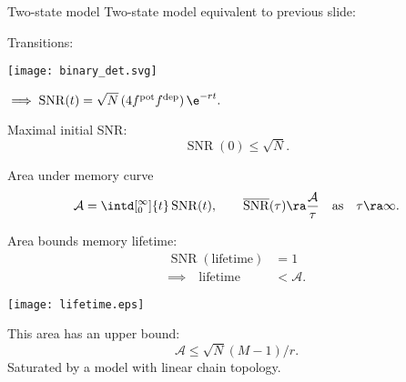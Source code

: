\documentclass[final]{beamer}%
\DeclareMathOperator{\SNR}{SNR}
\DeclareMathOperator{\snr}{SNR}
\newcommand{\snrb}{\overline{\snr}}
\newcommand{\pot}{^{\text{pot}}}
\newcommand{\dep}{^{\text{dep}}}
\newcommand{\area}{\mathcal{A}}
\begin{document}

\begin{frame}{Two-state model}
%
 Two-state model equivalent to previous slide:
  \begin{center}
  Transitions:
   \parbox{2cm}{\texttt{[image: binary\_det.svg]}}
   $\implies\snr(t)=\sqrt{N}\,(4 f\pot f\dep)\,\e^{-rt}.$
  \end{center}

 \vp Maximal initial SNR:\note[item]{$f\pot=\half$}
 \begin{equation*}
   \snr(0) \leq \sqrt{N}.
 \end{equation*}
%
\end{frame}


\begin{frame}{Area under memory curve}
%
  \begin{equation*}
    \area = \intd[_0^\infty]{t} \snr(t),
    \qquad
    \snrb(\tau) \ra \frac{\area}{\tau}
    \quad \text{as} \quad \tau \ra \infty.
  \end{equation*}
%


  \vp\parbox{5cm}{
  Area bounds memory lifetime:\\
  \begin{equation*}
  \begin{aligned}
    \SNR(\text{lifetime})&=1
    \\
    \implies
    \quad
    \text{lifetime} &< \area.
  \end{aligned}
  \end{equation*}
  }
  \parbox{6.5cm}{
    \texttt{[image: lifetime.eps]}
  }

  \vp This area has an upper bound:
  \begin{equation*}
    \area \leq \sqrt{N}(M-1)/r.
  \end{equation*}
  Saturated by a model with linear chain topology.
%
\end{frame}

\end{document}
